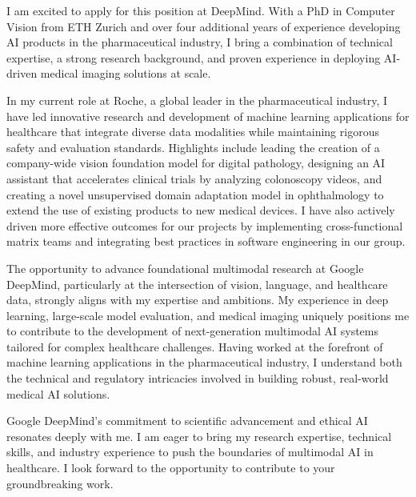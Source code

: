 \documentclass[10pt, letter]{ag-cv} %
\begin{document}
\makecvheader %

\makelettertitlenorec %


\begin{cvletter}






\begin{flushleft}
I am excited to apply for this position at DeepMind. With a PhD in Computer Vision from ETH Zurich and over four additional years of experience developing AI products in the pharmaceutical industry, I bring a combination of technical expertise, a strong research background, and proven experience in deploying AI-driven medical imaging solutions at scale. 

In my current role at Roche, a global leader in the pharmaceutical industry, I have led innovative research and development of machine learning applications for healthcare that integrate diverse data modalities while maintaining rigorous safety and evaluation standards. Highlights include leading the creation of a company-wide vision foundation model for digital pathology, designing an AI assistant that accelerates clinical trials by analyzing colonoscopy videos, and creating a novel unsupervised domain adaptation model in ophthalmology to extend the use of existing products to new medical devices. I have also actively driven more effective outcomes for our projects by implementing cross-functional matrix teams and integrating best practices in software engineering in our group.

The opportunity to advance foundational multimodal research at Google DeepMind, particularly at the intersection of vision, language, and healthcare data, strongly aligns with my expertise and ambitions. My experience in deep learning, large-scale model evaluation, and medical imaging uniquely positions me to contribute to the development of next-generation multimodal AI systems tailored for complex healthcare challenges. Having worked at the forefront of machine learning applications in the pharmaceutical industry, I understand both the technical and regulatory intricacies involved in building robust, real-world medical AI solutions.

Google DeepMind’s commitment to scientific advancement and ethical AI resonates deeply with me. I am eager to bring my research expertise, technical skills, and industry experience to push the boundaries of multimodal AI in healthcare. I look forward to the opportunity to contribute to your groundbreaking work.

\end{flushleft}

\end{cvletter}


\makeletterclosing %
\end{document}
